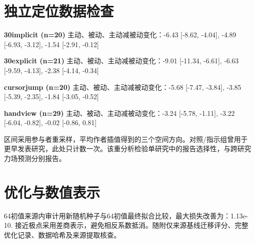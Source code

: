 \documentclass[11pt,a4paper]{article}
\begin{document}
\section{独立定位数据检查}
\textbf{30implicit (n=20)} 主动、被动、主动减被动变化：-6.43 [-8.62, -4.04], -4.89 [-6.93, -3.12], -1.54 [-2.91, -0.12]\par
\textbf{30explicit (n=21)} 主动、被动、主动减被动变化：-9.01 [-11.34, -6.61], -6.63 [-9.59, -4.13], -2.38 [-4.14, -0.34]\par
\textbf{cursorjump (n=20)} 主动、被动、主动减被动变化：-5.68 [-7.47, -3.84], -3.85 [-5.39, -2.35], -1.84 [-3.05, -0.52]\par
\textbf{handview (n=29)} 主动、被动、主动减被动变化：-3.24 [-5.78, -1.11], -3.22 [-6.04, -0.82], -0.02 [-0.86, 0.81]\par
区间采用参与者重采样，平均作者插值得到的三个空间方向。对照/指示组曾用于更早发表研究，此处只计数一次。该重分析检验单研究中的报告选择性，与跨研究力场预测分别报告。
\section{优化与数值表示}
64初值来源内审计用新随机种子与64初值最终拟合比较，最大损失改善为：1.13e-10. 接近极点采用差商表示，避免相反系数抵消。随附仅来源基线迁移评分、完整优化记录、数据哈希及来源提取核查。

\begingroup\fontsize{8.5}{9.6}\selectfont\setlength{\parskip}{0pt}\setlength{\bibsep}{0pt}\endgroup
\end{document}
